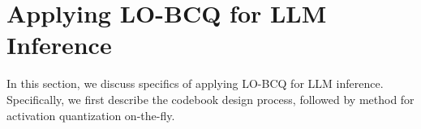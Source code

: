

\section{Applying LO-BCQ for LLM Inference}
In this section, we discuss specifics of applying LO-BCQ for LLM inference. Specifically, we first describe the codebook design process, followed by method for activation quantization on-the-fly.



